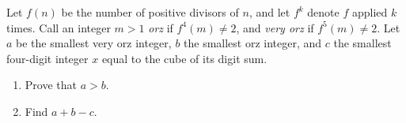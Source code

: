 Let $f(n)$ be the number of positive divisors of $n$, and let $f^k$ denote $f$ applied $k$ times. Call an integer $m>1$ \emph{orz} if $f^4(m)\ne2$, and \emph{very orz} if $f^5(m)\ne2$. Let $a$ be the smallest very orz integer, $b$ the smallest orz integer, and $c$ the smallest four-digit integer $x$ equal to the cube of its digit sum.
\begin{enumerate}
\item[(1)] Prove that $a>b$.
\item[(2)] Find $a+b-c$.
\end{enumerate}

